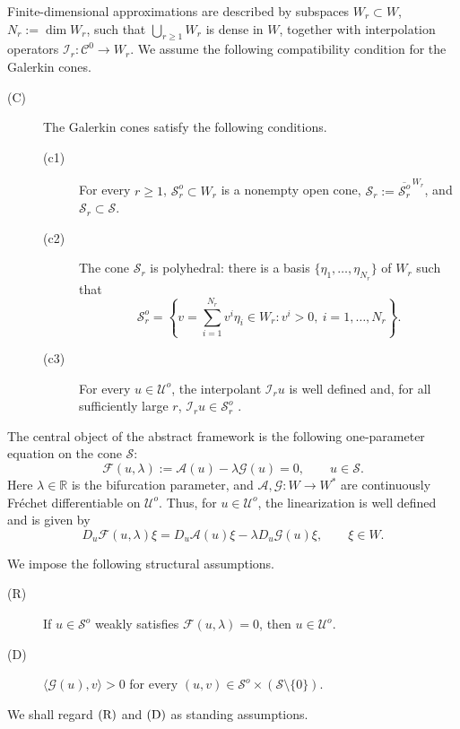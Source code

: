 \documentclass[preprint,10pt]{elsarticle}
\numberwithin{equation}{section}
\begin{document}
Finite-dimensional approximations are described by subspaces
\(W_r\subset W\), \(N_r:=\dim W_r\), such that
\(\bigcup_{r\ge1}W_r\) is dense in \(W\), together with interpolation
operators \(\mathcal I_r:\mathcal C^0\to W_r\). We assume the following
compatibility condition for the Galerkin cones.
\begin{description}
	\item[{\rm (C)}]
	The Galerkin cones satisfy the following conditions.
	\begin{description}
		\item[{\rm (c1)}]
		For every \(r\ge1\), \(\mathcal S_r^o\subset W_r\) is a nonempty open
		cone, \(\mathcal S_r:=\overline{\mathcal S_r^o}^{\,W_r}\), and
		\(\mathcal S_r\subset\mathcal S\).
		
		\item[{\rm (c2)}]
		The cone \(\mathcal S_r\) is polyhedral: there is a basis
		\(\{\eta_1,\ldots,\eta_{N_r}\}\) of \(W_r\) such that
		\[
		\mathcal S_r^o
		=
		\left\{
		v=\sum_{i=1}^{N_r}v^i\eta_i\in W_r:
		v^i>0,\ i=1,\ldots,N_r
		\right\}.
		\]
		
		\item[{\rm (c3)}]
		For every \(u\in\mathcal U^o\), the interpolant \(\mathcal I_ru\) is
		well defined and, for all sufficiently large \(r\),	\(\mathcal I_ru\in\mathcal S_r^o\) .
	\end{description}
\end{description}

The central object of the abstract framework is the following one-parameter
equation on the cone \(\mathcal S\):
\begin{equation}\label{Gf}
	\mathcal F(u,\lambda):=\mathcal A(u)-\lambda\mathcal G(u)=0,
	\qquad u\in\mathcal S .
\end{equation}
Here \(\lambda\in\mathbb R\) is the bifurcation parameter, and
\(\mathcal A,\mathcal G:W\to W^*\) are continuously Fr\'echet differentiable
on \(\mathcal U^o\). Thus, for \(u\in\mathcal U^o\), the linearization is well
defined and is given by
\[
D_u\mathcal F(u,\lambda)\xi
=
D_u\mathcal A(u)\xi-\lambda D_u\mathcal G(u)\xi,
\qquad \xi\in W .
\]


We impose the following structural assumptions.
\begin{description}
	\item[{\rm (R)}]
	If \(u\in\mathcal S^o\) weakly satisfies \(\mathcal F(u,\lambda)=0\), then
	\(u\in\mathcal U^o\).
	
	\item[{\rm (D)}]
	\(\langle\mathcal G(u),v\rangle>0\) for every
	\((u,v)\in\mathcal S^o\times(\mathcal S\setminus\{0\})\).
\end{description}
We shall regard \({\rm (R)}\) and \({\rm (D)}\) as standing assumptions.
\end{document}
